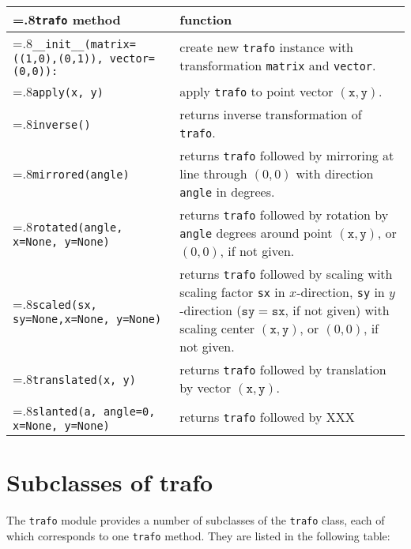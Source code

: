 \medskip
\begin{tabularx}{\linewidth}{>{\hsize=.8\hsize}X>{\raggedright\arraybackslash\hsize=1.2\hsize}X}
\texttt{trafo} method & function \\
\hline
\texttt{\_\_init\_\_(matrix=((1,0),(0,1)),\newline
\phantom{\_\_init\_\_(}vector=(0,0)):} & create new \texttt{trafo}
instance with transformation \texttt{matrix} and \texttt{vector}.
\\
\texttt{apply(x, y)} & apply \texttt{trafo} to point vector
$(\mathtt{x}, \mathtt{y})$.\\
\texttt{inverse()} & returns inverse transformation of
\texttt{trafo}.\\
\texttt{mirrored(angle)} & returns \texttt{trafo} followed by mirroring
at line through $(0,0)$ with  direction \texttt{angle} in degrees.\\
\texttt{rotated(angle, \newline\phantom{rotate(}x=None, y=None)} &
returns \texttt{trafo} followed by rotation by \texttt{angle} degrees
around point $(\mathtt{x},
\mathtt{y})$, or $(0,0)$, if not given.\\
\texttt{scaled(sx, sy=None,\newline\phantom{scale(}x=None, y=None)} &
returns \texttt{trafo} followed by
scaling with scaling factor \texttt{sx} in $x$-direction, \texttt{sy} in
$y$-direction ($\mathtt{sy}=\mathtt{sx}$, if not given) with scaling
center $(\mathtt{x}, \mathtt{y})$, or $(0,0)$, if not given.\\
\texttt{translated(x, y)} & returns \texttt{trafo} followed by
translation by vector $(\mathtt{x}, \mathtt{y})$.\\
\texttt{slanted(a, angle=0, x=None, y=None)} & returns \texttt{trafo}
followed by XXX\\
\end{tabularx}
\medskip



\section{Subclasses of trafo}

The \verb|trafo| module provides a number of subclasses of
the \verb|trafo| class, each of which corresponds to one \verb|trafo|
method. They are listed in the following table:

